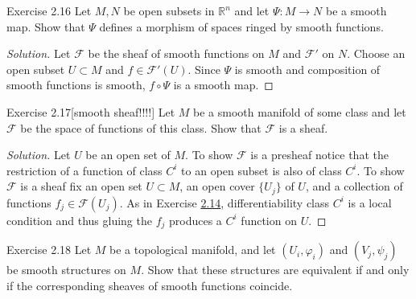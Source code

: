 \begin{thing4}{Exercise 2.16}\label{exer:2.16}\leavevmode
Let $M, N$ be open subsets in $\mathbb{R}^n$ and let  $\Psi:M \to N$ be a smooth map. Show that $\Psi$ defines a morphism of spaces ringed by smooth functions.
\end{thing4}

\begin{proof}[Solution]\leavevmode
Let $\mathcal{F}$ be the sheaf of smooth functions on $M$ and  $\mathcal{F}'$ on $N$. Choose an open subset $U\subset M$ and $f \in \mathcal{F}'(U)$. Since $\Psi$ is smooth and composition of smooth functions is smooth, $f \circ \Psi$ is a smooth map.
\end{proof}

\begin{thing4}{Exercise 2.17}[smooth sheaf!!!!]\label{exer:2.17}\leavevmode
Let $M$ be a smooth manifold of some class and let $\mathcal{F}$ be the space of functions of this class. Show that $\mathcal{F}$ is a sheaf.
\end{thing4}

\begin{proof}[Solution]\leavevmode
Let $U$ be an open set of $M$. To show $\mathcal{F}$ is a presheaf notice that the restriction of a function of class $C^i$ to an open subset is also of class $C^i$. To show $\mathcal{F}$ is a sheaf fix an open set $U \subset M$, an open cover $\{U_j\}$ of $U$, and a collection of functions $f_j \in \mathcal{F}(U_j)$. As in Exercise \hyperref[exer:2.14]{2.14}, differentiability class $C^i$ is a local condition and thus gluing the $f_j$ produces a $C^i$ function on $U$.
\end{proof}

\begin{thing4}{Exercise 2.18}\label{exer:2.18}\leavevmode
Let $M$ be a topological manifold, and let $(U_i,\varphi_i)$ and $(V_j,\psi_j)$ be smooth structures on $M$. Show that these structures are equivalent if and only if the corresponding sheaves of smooth functions coincide.
\end{thing4}

